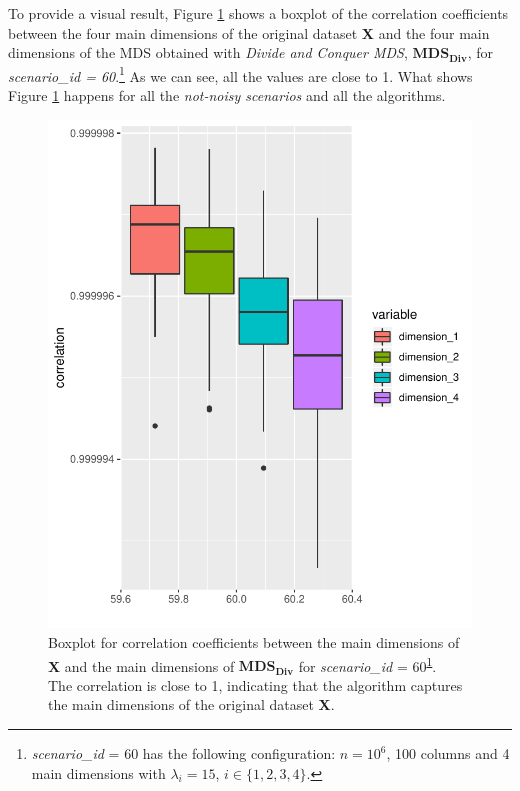 \documentclass[11pt]{report}
\begin{document}
\indent To provide a visual result, Figure \ref{divide_correlation_scenario_60} 
shows a boxplot of the correlation coefficients between the four main 
dimensions of the original dataset \textbf{X} and the four main dimensions 
of the MDS obtained with \textit{Divide and Conquer MDS}, $\mathbf{MDS_{Div}}$, 
for \textit{scenario\_id = 60}.\footnote{\textit{scenario\_id} = 60 
has the following configuration: $n=10^6$, 100 columns and 4 main dimensions 
with $\lambda_i = 15$, $i \in \{1, 2, 3, 4 \}$.\label{s60}} 
As we can see, all the values are close to 1. What shows Figure 
\ref{divide_correlation_scenario_60} happens for all the 
\textit{not-noisy scenarios} and all the algorithms. 

\begin{figure}[!h]
\centering
    \includegraphics[scale = 1.2]{./images/example_corr_divide.pdf}
    \caption{
    Boxplot for correlation coefficients between the main dimensions of \textbf{X} 
    and the main dimensions of $\mathbf{MDS_{Div}}$ for
    \textit{scenario\_id } = 60\textsuperscript{\ref{s60}}. \\
    The correlation is close to 1, indicating that the algorithm captures 
    the main dimensions of the original dataset \textbf{X}.
    }
    \label{divide_correlation_scenario_60}
\end{figure}
\end{document}
